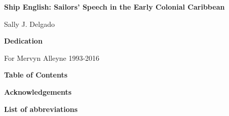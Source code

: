 
\clearpage\setcounter{page}{1}\begin{styleStandard}
\textbf{Ship English: Sailors’ Speech in the Early Colonial Caribbean}
\end{styleStandard}


\begin{styleStandard}
Sally J. Delgado
\end{styleStandard}


\clearpage\begin{styleStandard}
\textbf{Dedication}
\end{styleStandard}


\begin{styleStandard}
For Mervyn Alleyne 1993-2016
\end{styleStandard}


\clearpage\begin{styleNormali}
\textbf{Table of Contents}
\end{styleNormali}


\begin{styleNormali}
\textbf{Acknowledgements }
\end{styleNormali}


\begin{styleNormali}
\textbf{List of abbreviations }
\end{styleNormali}


